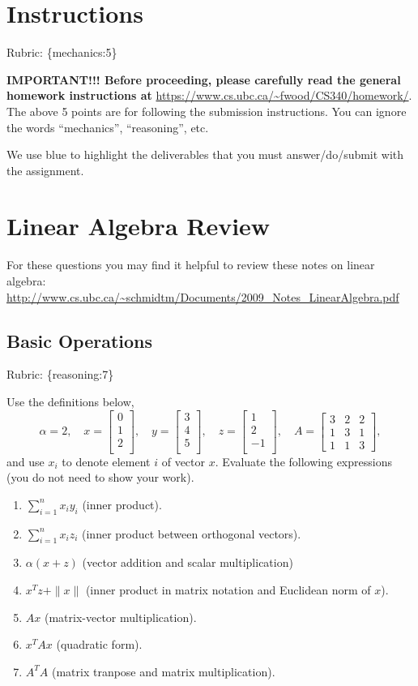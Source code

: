 \documentclass{article}
\def\rubric#1{\gre{Rubric: \{#1\}}}{}
\def\blu#1{{\color{blu}#1}}
\def\gre#1{{\color{gre}#1}}
\def\norm#1{\|#1\|}
\def\enum#1{\begin{enumerate}#1\end{enumerate}}
\begin{document}
\section*{Instructions}
\rubric{mechanics:5}

\textbf{IMPORTANT!!! Before proceeding, please carefully read the general homework instructions at} \url{https://www.cs.ubc.ca/~fwood/CS340/homework/}. The above 5 points are for following the submission instructions. You can ignore the words ``mechanics'', ``reasoning'', etc.

\vspace{1em}
We use \blu{blue} to highlight the deliverables that you must answer/do/submit with the assignment.

\section{Linear Algebra Review}

For these questions you may find it helpful to review these notes on linear algebra:\\
\url{http://www.cs.ubc.ca/~schmidtm/Documents/2009_Notes_LinearAlgebra.pdf}

\subsection{Basic Operations}
\rubric{reasoning:7}

Use the definitions below,
\[
\alpha = 2,\quad
x = \left[\begin{array}{c}
0\\
1\\
2\\
\end{array}\right], \quad
y = \left[\begin{array}{c}
3\\
4\\
5\\
\end{array}\right],\quad
z = \left[\begin{array}{c}
1\\
2\\
-1\\
\end{array}\right],\quad
A = \left[\begin{array}{ccc}
3 & 2 & 2\\
1 & 3 & 1\\
1 & 1 & 3
\end{array}\right],
\]
and use $x_i$ to denote element $i$ of vector $x$.
\blu{Evaluate the following expressions} (you do not need to show your work).
\enum{
\item $\sum_{i=1}^n x_iy_i$ (inner product).
\item $\sum_{i=1}^n x_iz_i$ (inner product between orthogonal vectors).
\item $\alpha(x+z)$ (vector addition and scalar multiplication)
\item $x^Tz + \norm{x}$ (inner product in matrix notation and Euclidean norm of $x$).
\item $Ax$ (matrix-vector multiplication).
\item $x^TAx$ (quadratic form).
\item $A^TA$ (matrix tranpose and matrix multiplication).
}
\end{document}
